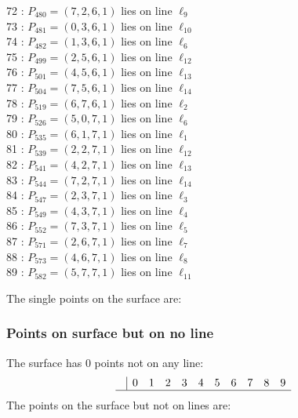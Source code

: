 \documentclass{article}
\begin{document}
{\begin{multicols}{2}
72 : $P_{480}=( 7, 2, 6, 1 )$ lies on line $\ell_{9}$\\
73 : $P_{481}=( 0, 3, 6, 1 )$ lies on line $\ell_{10}$\\
74 : $P_{482}=( 1, 3, 6, 1 )$ lies on line $\ell_{6}$\\
75 : $P_{499}=( 2, 5, 6, 1 )$ lies on line $\ell_{12}$\\
76 : $P_{501}=( 4, 5, 6, 1 )$ lies on line $\ell_{13}$\\
77 : $P_{504}=( 7, 5, 6, 1 )$ lies on line $\ell_{14}$\\
78 : $P_{519}=( 6, 7, 6, 1 )$ lies on line $\ell_{2}$\\
79 : $P_{526}=( 5, 0, 7, 1 )$ lies on line $\ell_{6}$\\
80 : $P_{535}=( 6, 1, 7, 1 )$ lies on line $\ell_{1}$\\
81 : $P_{539}=( 2, 2, 7, 1 )$ lies on line $\ell_{12}$\\
82 : $P_{541}=( 4, 2, 7, 1 )$ lies on line $\ell_{13}$\\
83 : $P_{544}=( 7, 2, 7, 1 )$ lies on line $\ell_{14}$\\
84 : $P_{547}=( 2, 3, 7, 1 )$ lies on line $\ell_{3}$\\
85 : $P_{549}=( 4, 3, 7, 1 )$ lies on line $\ell_{4}$\\
86 : $P_{552}=( 7, 3, 7, 1 )$ lies on line $\ell_{5}$\\
87 : $P_{571}=( 2, 6, 7, 1 )$ lies on line $\ell_{7}$\\
88 : $P_{573}=( 4, 6, 7, 1 )$ lies on line $\ell_{8}$\\
89 : $P_{582}=( 5, 7, 7, 1 )$ lies on line $\ell_{11}$\\
\end{multicols}
The single points on the surface are:\\
\subsubsection*{Points on surface but on no line}
The surface has 0 points not on any line:\\
$$
\begin{array}{r|*{10}{r}}
 & 0 & 1 & 2 & 3 & 4 & 5 & 6 & 7 & 8 & 9\\
\hline
\end{array}
$$
The points on the surface but not on lines are:\\
\begin{multicols}{2}
\noindent
\end{multicols}
}
\end{document}
